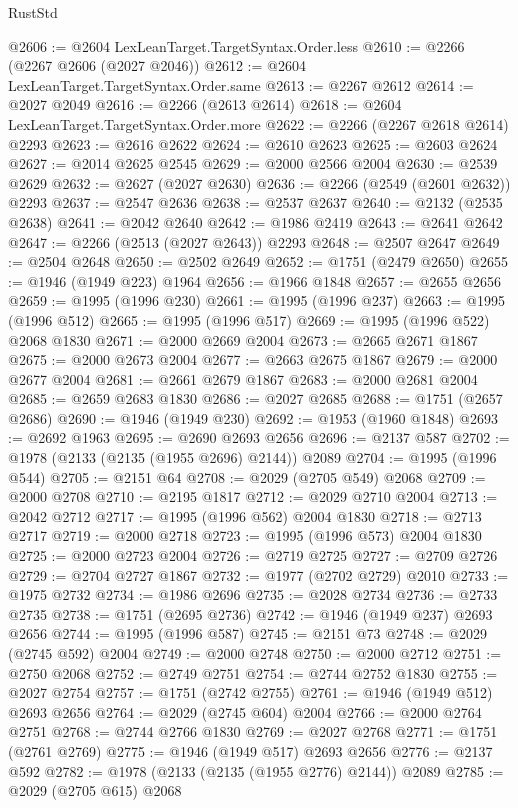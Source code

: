 \begin{lexlean}{RustStd}
\begin{coremodule}
@2606 := @2604 LexLeanTarget.TargetSyntax.Order.less
@2610 := @2266 (@2267 @2606 (@2027 @2046))
@2612 := @2604 LexLeanTarget.TargetSyntax.Order.same
@2613 := @2267 @2612
@2614 := @2027 @2049
@2616 := @2266 (@2613 @2614)
@2618 := @2604 LexLeanTarget.TargetSyntax.Order.more
@2622 := @2266 (@2267 @2618 @2614) @2293
@2623 := @2616 @2622
@2624 := @2610 @2623
@2625 := @2603 @2624
@2627 := @2014 @2625 @2545
@2629 := @2000 @2566 @2004
@2630 := @2539 @2629
@2632 := @2627 (@2027 @2630)
@2636 := @2266 (@2549 (@2601 @2632)) @2293
@2637 := @2547 @2636
@2638 := @2537 @2637
@2640 := @2132 (@2535 @2638)
@2641 := @2042 @2640
@2642 := @1986 @2419
@2643 := @2641 @2642
@2647 := @2266 (@2513 (@2027 @2643)) @2293
@2648 := @2507 @2647
@2649 := @2504 @2648
@2650 := @2502 @2649
@2652 := @1751 (@2479 @2650)
@2655 := @1946 (@1949 @223) @1964
@2656 := @1966 @1848
@2657 := @2655 @2656
@2659 := @1995 (@1996 @230)
@2661 := @1995 (@1996 @237)
@2663 := @1995 (@1996 @512)
@2665 := @1995 (@1996 @517)
@2669 := @1995 (@1996 @522) @2068 @1830
@2671 := @2000 @2669 @2004
@2673 := @2665 @2671 @1867
@2675 := @2000 @2673 @2004
@2677 := @2663 @2675 @1867
@2679 := @2000 @2677 @2004
@2681 := @2661 @2679 @1867
@2683 := @2000 @2681 @2004
@2685 := @2659 @2683 @1830
@2686 := @2027 @2685
@2688 := @1751 (@2657 @2686)
@2690 := @1946 (@1949 @230)
@2692 := @1953 (@1960 @1848)
@2693 := @2692 @1963
@2695 := @2690 @2693 @2656
@2696 := @2137 @587
@2702 := @1978 (@2133 (@2135 (@1955 @2696) @2144)) @2089
@2704 := @1995 (@1996 @544)
@2705 := @2151 @64
@2708 := @2029 (@2705 @549) @2068
@2709 := @2000 @2708
@2710 := @2195 @1817
@2712 := @2029 @2710 @2004
@2713 := @2042 @2712
@2717 := @1995 (@1996 @562) @2004 @1830
@2718 := @2713 @2717
@2719 := @2000 @2718
@2723 := @1995 (@1996 @573) @2004 @1830
@2725 := @2000 @2723 @2004
@2726 := @2719 @2725
@2727 := @2709 @2726
@2729 := @2704 @2727 @1867
@2732 := @1977 (@2702 @2729) @2010
@2733 := @1975 @2732
@2734 := @1986 @2696
@2735 := @2028 @2734
@2736 := @2733 @2735
@2738 := @1751 (@2695 @2736)
@2742 := @1946 (@1949 @237) @2693 @2656
@2744 := @1995 (@1996 @587)
@2745 := @2151 @73
@2748 := @2029 (@2745 @592) @2004
@2749 := @2000 @2748
@2750 := @2000 @2712
@2751 := @2750 @2068
@2752 := @2749 @2751
@2754 := @2744 @2752 @1830
@2755 := @2027 @2754
@2757 := @1751 (@2742 @2755)
@2761 := @1946 (@1949 @512) @2693 @2656
@2764 := @2029 (@2745 @604) @2004
@2766 := @2000 @2764 @2751
@2768 := @2744 @2766 @1830
@2769 := @2027 @2768
@2771 := @1751 (@2761 @2769)
@2775 := @1946 (@1949 @517) @2693 @2656
@2776 := @2137 @592
@2782 := @1978 (@2133 (@2135 (@1955 @2776) @2144)) @2089
@2785 := @2029 (@2705 @615) @2068

\end{coremodule}
\end{lexlean}
